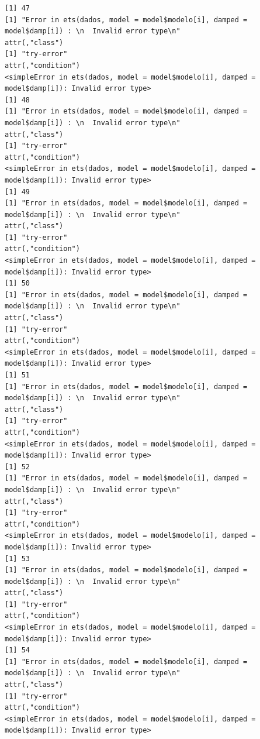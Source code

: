 \documentclass[
  letterpaper,
  DIV=11,
  numbers=noendperiod]{scrartcl}
\begin{document}
\begin{verbatim}
[1] 47
[1] "Error in ets(dados, model = model$modelo[i], damped = model$damp[i]) : \n  Invalid error type\n"
attr(,"class")
[1] "try-error"
attr(,"condition")
<simpleError in ets(dados, model = model$modelo[i], damped = model$damp[i]): Invalid error type>
[1] 48
[1] "Error in ets(dados, model = model$modelo[i], damped = model$damp[i]) : \n  Invalid error type\n"
attr(,"class")
[1] "try-error"
attr(,"condition")
<simpleError in ets(dados, model = model$modelo[i], damped = model$damp[i]): Invalid error type>
[1] 49
[1] "Error in ets(dados, model = model$modelo[i], damped = model$damp[i]) : \n  Invalid error type\n"
attr(,"class")
[1] "try-error"
attr(,"condition")
<simpleError in ets(dados, model = model$modelo[i], damped = model$damp[i]): Invalid error type>
[1] 50
[1] "Error in ets(dados, model = model$modelo[i], damped = model$damp[i]) : \n  Invalid error type\n"
attr(,"class")
[1] "try-error"
attr(,"condition")
<simpleError in ets(dados, model = model$modelo[i], damped = model$damp[i]): Invalid error type>
[1] 51
[1] "Error in ets(dados, model = model$modelo[i], damped = model$damp[i]) : \n  Invalid error type\n"
attr(,"class")
[1] "try-error"
attr(,"condition")
<simpleError in ets(dados, model = model$modelo[i], damped = model$damp[i]): Invalid error type>
[1] 52
[1] "Error in ets(dados, model = model$modelo[i], damped = model$damp[i]) : \n  Invalid error type\n"
attr(,"class")
[1] "try-error"
attr(,"condition")
<simpleError in ets(dados, model = model$modelo[i], damped = model$damp[i]): Invalid error type>
[1] 53
[1] "Error in ets(dados, model = model$modelo[i], damped = model$damp[i]) : \n  Invalid error type\n"
attr(,"class")
[1] "try-error"
attr(,"condition")
<simpleError in ets(dados, model = model$modelo[i], damped = model$damp[i]): Invalid error type>
[1] 54
[1] "Error in ets(dados, model = model$modelo[i], damped = model$damp[i]) : \n  Invalid error type\n"
attr(,"class")
[1] "try-error"
attr(,"condition")
<simpleError in ets(dados, model = model$modelo[i], damped = model$damp[i]): Invalid error type>
\end{verbatim}
\end{document}
